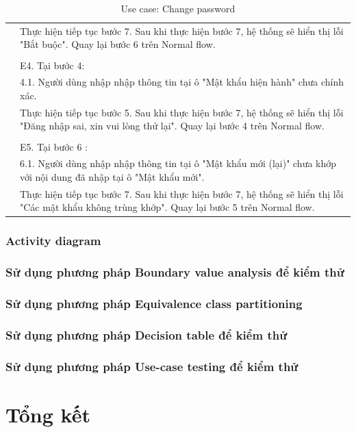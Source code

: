 \documentclass[a4paper, 12pt]{article}
\begin{document}
\begin{table}[H]
\begin{tabular}{|l|p{11cm}|}
        & Thực hiện tiếp tục bước 7. Sau khi thực hiện bước 7, hệ thống sẽ hiển thị lỗi "Bắt buộc". Quay lại bước 6 trên Normal flow. \\
        & \\
        & E4. Tại bước 4: \\
        & 4.1. Người dùng nhập nhập thông tin tại ô "Mật khẩu hiện hành" chưa chính xác. \\
        & Thực hiện tiếp tục bước 5. Sau khi thực hiện bước 7, hệ thống sẽ hiển thị lỗi "Đăng nhập sai, xin vui lòng thử lại". Quay lại bước 4 trên Normal flow. \\
        & \\
        & E5. Tại bước 6 : \\
        & 6.1. Người dùng nhập nhập thông tin tại ô "Mật khẩu mới (lại)" chưa khớp với nội dung đã nhập tại ô "Mật khẩu mới". \\
        & Thực hiện tiếp tục bước 7. Sau khi thực hiện bước 7, hệ thống sẽ hiển thị lỗi "Các mật khẩu không trùng khớp". Quay lại bước 5 trên Normal flow. \\
        \hline
    \end{tabular}
    \caption{Use case: Change password}
    \label{Use case: Change password}
\end{table}
\subsubsection{Activity diagram}
\subsubsection{Sử dụng phương pháp Boundary value analysis để kiểm thử}
\subsubsection{Sử dụng phương pháp Equivalence class partitioning}
\subsubsection{Sử dụng phương pháp Decision table để kiểm thử}
\subsubsection{Sử dụng phương pháp Use-case testing để kiểm thử}

\section{Tổng kết}
\end{document}

